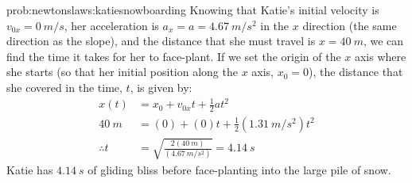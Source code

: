 \begin{solution}{prob:newtonslaws:katiesnowboarding}
Knowing that Katie's initial velocity is $v_{0x}=\SI{0}{m/s}$, her acceleration is $a_x=a=\SI{4.67}{m/s^2}$ in the $x$ direction (the same direction as the slope), and the distance that she must travel is $x=\SI{40}{m}$, we can find the time it takes for her to face-plant. If we set the origin of the $x$ axis where she starts (so that her initial position along the $x$ axis, $x_0=0$), the distance that she covered in the time, $t$, is given by:
\begin{align*}
x(t)&=x_0+v_{0x}t+\frac{1}{2}at^2\\
\SI{40}{m}&=(0)+(0)t+\frac{1}{2}(\SI{1.31}{m/s^2})t^2\\
\therefore t&=\sqrt{\frac{2(\SI{40}{m})}{(\SI{4.67}{m/s^2})}}=\SI{4.14}{s}
\end{align*}
Katie has $\SI{4.14}{s}$ of gliding bliss before face-planting into the large pile of snow.
\end{solution}

